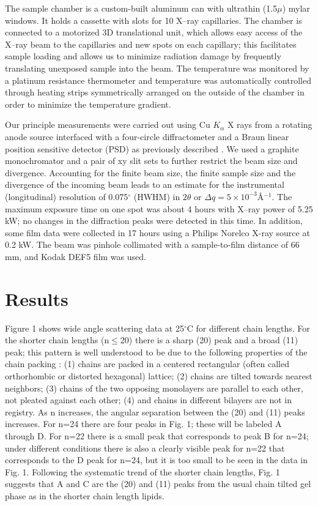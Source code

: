 The sample chamber is a custom-built aluminum can with ultrathin (1.5$\mu$) 
mylar windows. It holds a cassette with slots for 10 X--ray capillaries. The 
chamber is connected to a motorized 3D translational unit, which allows easy 
access of the X--ray beam to the capillaries and new spots on each capillary; 
this facilitates sample loading and allows us to minimize radiation damage by 
frequently translating unexposed sample into the beam. The temperature was 
monitored by a platinum resistance thermometer and temperature was 
automatically controlled through heating strips symmetrically arranged on the 
outside of the chamber in order to minimize the temperature gradient.

Our principle measurements were carried out using Cu $K_{\alpha}$ X rays
from a rotating anode source interfaced with a four-circle diffractometer 
and a Braun linear position sensitive detector (PSD) as previously described 
\cite{Sun94}. We used a graphite monochromator and a pair of xy slit sets to 
further restrict the beam size and divergence. Accounting for the finite beam 
size, the finite sample size and the divergence of the incoming beam leads to 
an estimate for the instrumental (longitudinal) resolution of 0.075$^{\circ}$
 (HWHM) in $2 \theta$ or $\Delta q = 5 \times 10^{-3}$\AA$ ^{-1}$.  
The maximum exposure time on one spot was about 4 hours with X--ray 
power of 5.25 kW; no changes in the diffraction peaks were detected
in this time. In addition, some film data were collected in 17 hours using a 
Philips Norelco X-ray source at 0.2 kW.  The beam was pinhole collimated with 
a sample-to-film distance of 66 mm, and Kodak DEF5 film was used.

\section{Results}
 
Figure 1 shows wide angle scattering data at 25$^{\circ}$C for different chain
lengths.  For the shorter chain lengths (n$\leq$20) there is a sharp (20) peak 
and a broad (11) peak; this pattern is well understood to be due to the 
following properties of the chain packing \cite{Sun94,HenHos83,HenRus91,Smi88}:
(1) chains are packed in a centered rectangular (often called
orthorhombic or distorted hexagonal) lattice; 
(2) chains are tilted towards nearest neighbors;
(3) chains of the two opposing monolayers are parallel to each other, not 
pleated against each other;
(4) and chains in different bilayers are not in registry.  As n increases,
the angular separation between the (20) and (11) peaks increases.
For n=24 there are four peaks in Fig. 1; these will be
labeled A through D.  For n=22 there is a small peak that corresponds to
peak B for n=24; under different conditions there is also a clearly
visible peak for n=22 that corresponds to the D peak
for n=24, but it is too small to be seen in the data in Fig. 1.
Following the systematic trend of the shorter chain
lengths, Fig. 1 suggests that A and C are the (20) and (11) peaks from the 
usual chain tilted gel phase as in the shorter chain length lipids.


